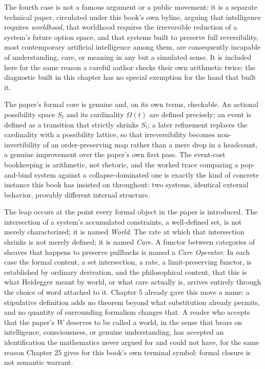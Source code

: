 \documentclass[11pt]{book}
\begin{document}
The fourth case is not a famous argument or a public movement; it is a separate technical paper, circulated under this book's own byline, arguing that intelligence requires \emph{worldhood}, that worldhood requires the irreversible reduction of a system's future option space, and that systems built to preserve full reversibility, most contemporary artificial intelligence among them, are consequently incapable of understanding, care, or meaning in any but a simulated sense. It is included here for the same reason a careful author checks their own arithmetic twice: the diagnostic built in this chapter has no special exemption for the hand that built it.

The paper's formal core is genuine and, on its own terms, checkable. An actional possibility space $S_t$ and its cardinality $\Omega(t)$ are defined precisely; an event is defined as a transition that strictly shrinks $S_t$; a later refinement replaces the cardinality with a possibility lattice, so that irreversibility becomes non-invertibility of an order-preserving map rather than a mere drop in a headcount, a genuine improvement over the paper's own first pass. The event-cost bookkeeping is arithmetic, not rhetoric, and the worked trace comparing a pop-and-bind system against a collapse-dominated one is exactly the kind of concrete instance this book has insisted on throughout: two systems, identical external behavior, provably different internal structure.

The leap occurs at the point every formal object in the paper is introduced. The intersection of a system's accumulated constraints, a well-defined set, is not merely characterized; it is named \emph{World}. The rate at which that intersection shrinks is not merely defined; it is named \emph{Care}. A functor between categories of sheaves that happens to preserve pullbacks is named a \emph{Care Operator}. In each case the formal content, a set intersection, a rate, a limit-preserving functor, is established by ordinary derivation, and the philosophical content, that this is what Heidegger meant by world, or what care actually is, arrives entirely through the choice of word attached to it. Chapter 5 already gave this move a name: a stipulative definition adds no theorem beyond what substitution already permits, and no quantity of surrounding formalism changes that. A reader who accepts that the paper's $W$ deserves to be called a world, in the sense that bears on intelligence, consciousness, or genuine understanding, has accepted an identification the mathematics never argued for and could not have, for the same reason Chapter 25 gives for this book's own terminal symbol: formal closure is not semantic warrant.
\end{document}
